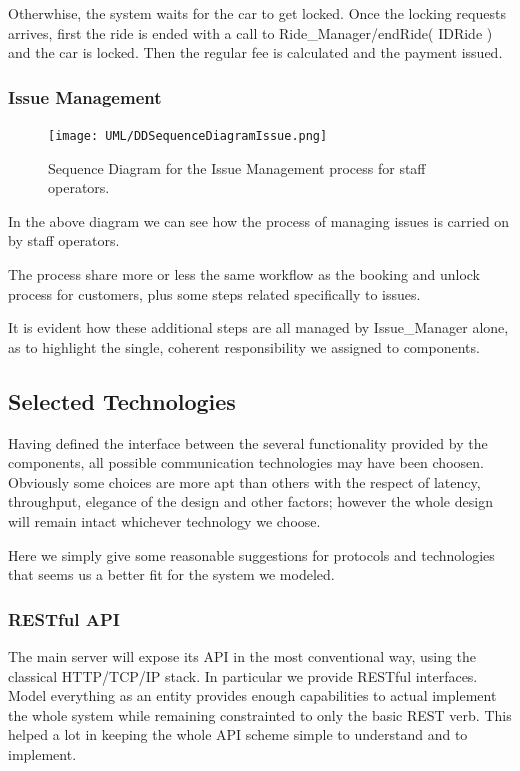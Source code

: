 \documentclass[11pt]{article} %
\begin{document}
Otherwhise, the system waits for the car to get locked. Once the locking requests arrives, first the ride is ended with a call to Ride\_Manager/endRide( IDRide ) and the car is locked. Then the regular fee is calculated and the payment issued.


\subsubsection{Issue Management}
\begin{figure}[H]
	\centering
	\texttt{[image: UML/DDSequenceDiagramIssue.png]}
	\caption{Sequence Diagram for the Issue Management process for staff operators.}
\end{figure}

In the above diagram we can see how the process of managing issues is carried on by staff operators.

The process share more or less the same workflow as the booking and unlock process for customers, plus some steps related specifically to issues.

It is evident how these additional steps are all managed by Issue\_Manager alone, as to highlight the single, coherent responsibility we assigned to components.







\subsection{Selected Technologies}

Having defined the interface between the several functionality provided by the components, all possible communication technologies may have been choosen. Obviously some choices are more apt than others with the respect of latency, throughput, elegance of the design and other factors; however the whole design will remain intact whichever technology we choose.

Here we simply give some reasonable suggestions for protocols and technologies that seems us a better fit for the system we modeled.

\subsubsection{RESTful API}

The main server will expose its API in the most conventional way, using the classical HTTP/TCP/IP stack. In particular we provide RESTful interfaces. Model everything as an entity provides enough capabilities to actual implement the whole system while remaining constrainted to only the basic REST verb. This helped a lot in keeping the whole API scheme simple to understand and to implement.
\end{document}
